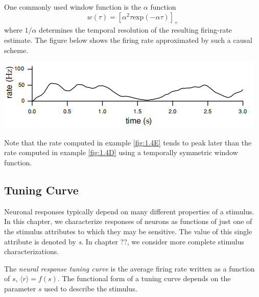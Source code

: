 \begin{exm}
  \label{fig:1.4E}
  One commonly used window function is the $\alpha$ function
  \begin{equation}
    w(\tau)=[\alpha^2 \tau \text{exp}(-\alpha\tau) ]_+ 
  \end{equation}
  where $1/\alpha$ determines the temporal resolution of the resulting firing-rate
 estimate. The figure below shows the firing rate approximated by such a causal scheme.
\end{exm}

\begin{center}
  \includegraphics[scale=0.72]{./png/fig_1_4E.png}
\end{center}

\begin{rem}
  Note that the rate computed in example \ref{fig:1.4E} tends to peak later than the 
  rate computed in example \ref{fig:1.4D} using a temporally symmetric window function.%
\end{rem}

\subsection{Tuning Curve}

\begin{rem}
  Neuronal responses typically depend on many different properties of a
stimulus. In this chapter, we characterize responses of neurons as functions of 
just one of the stimulus attributes to which they may be sensitive. The value of this 
single attribute is denoted by \emph{s}. In chapter ??, we consider
more complete stimulus characterizations.
\end{rem}

\begin{defn}
  The \emph{neural response tuning curve} is the average firing rate written 
  as a function of $s$, $\langle r\rangle =f(s)$. The functional form of a tuning 
  curve depends on the parameter $s$ used to describe the stimulus. 
\end{defn}

